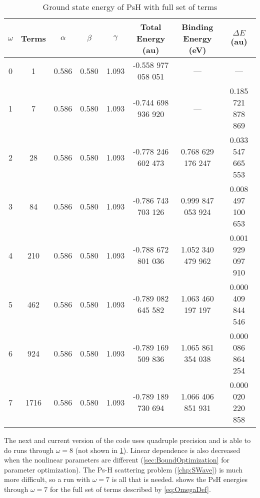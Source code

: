 \documentclass[Dissertation.tex]{subfiles}
\begin{document}
\setlength{\abovecaptionskip}{6pt}   %
\setlength{\belowcaptionskip}{6pt}   %
\begin{table}[H]
\small
\centering
\begin{tabular}{c c c c c c c c}
\toprule
$\omega$ & Terms & $\alpha$ & $\beta$ & $\gamma$ & Total Energy (au) & Binding Energy (eV) & $\Delta E$ (au) \\ [0.5ex]
\midrule
0 & 1    & 0.586 & 0.580 & 1.093 & -0.558 977 058 051 & --- & --- \\
1 & 7    & 0.586 & 0.580 & 1.093 & -0.744 698 936 920 & ---               & 0.185 721 878 869 \\
2 & 28   & 0.586 & 0.580 & 1.093 & -0.778 246 602 473 & 0.768 629 176 247 & 0.033 547 665 553 \\
3 & 84   & 0.586 & 0.580 & 1.093 & -0.786 743 703 126 & 0.999 847 053 924 & 0.008 497 100 653 \\
4 & 210  & 0.586 & 0.580 & 1.093 & -0.788 672 801 036 & 1.052 340 479 962 & 0.001 929 097 910 \\
5 & 462  & 0.586 & 0.580 & 1.093 & -0.789 082 645 582 & 1.063 460 197 197 & 0.000 409 844 546 \\
6 & 924  & 0.586 & 0.580 & 1.093 & -0.789 169 509 836 & 1.065 861 354 038 & 0.000 086 864 254 \\
7 & 1716 & 0.586 & 0.580 & 1.093 & -0.789 189 730 694 & 1.066 406 851 931 & 0.000 020 220 858 \\
\bottomrule
\end{tabular}
\caption{Ground state energy of PsH with full set of terms}
\label{tab:BoundEnergy1}
\end{table}

The next and current version of the code uses quadruple precision and is able to do runs through $\omega = 8$ (not shown in \cref{tab:BoundEnergy1}). Linear dependence is also decreased when the nonlinear parameters are different (\cref{sec:BoundOptimization} for parameter optimization). The Ps-H scattering problem (\cref{chp:SWave}) is much more difficult, so a run with $\omega = 7$ is all that is needed.  shows the PsH energies through $\omega = 7$ for the full set of terms described by \cref{eq:OmegaDef}.
\end{document}
